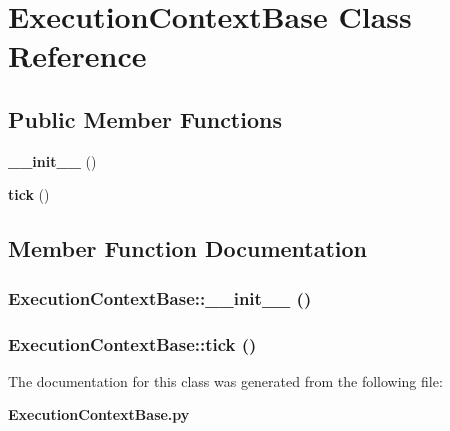 \section{Execution\-Context\-Base Class Reference}
\label{classExecutionContextBase}
\subsection*{Public Member Functions}
\begin{CompactItemize}
\item 
{\bf \_\-\_\-init\_\-\_\-} ()
\item 
{\bf tick} ()
\end{CompactItemize}


\subsection{Member Function Documentation}
\subsubsection{\setlength{\rightskip}{0pt plus 5cm}Execution\-Context\-Base::\_\-\_\-init\_\-\_\- ()}\label{classExecutionContextBase_ExecutionContextBasea0}


\subsubsection{\setlength{\rightskip}{0pt plus 5cm}Execution\-Context\-Base::tick ()}\label{classExecutionContextBase_ExecutionContextBasea1}




The documentation for this class was generated from the following file:\begin{CompactItemize}
\item 
{\bf Execution\-Context\-Base.py}\end{CompactItemize}
